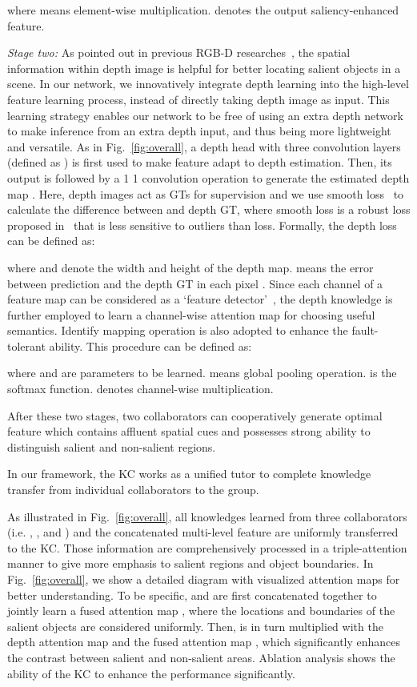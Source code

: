 \documentclass[runningheads]{llncs}
\begin{document}
where  means element-wise multiplication.  denotes the output saliency-enhanced feature.


\emph{ Stage two:} 
As pointed out in previous RGB-D researches~\cite{3DDMRA,3DCPFP}, the spatial information within depth image is helpful for better locating salient objects in a scene.
In our network, we innovatively integrate depth learning into the high-level feature learning process, instead of directly taking depth image as input.
This learning strategy enables our network to be free of using an extra depth network to make inference from an extra depth input,
and thus being more lightweight and versatile.
As in Fig.~\ref{fig:overall}, a depth head with three convolution layers (defined as ) is first used to make feature  adapt to depth estimation.
Then, its output  is followed by a 1  1 convolution operation to generate the estimated depth map .
Here, depth images act as GTs for supervision and we use smooth  loss~\cite{FastRCNN} to calculate the difference between  and depth GT,
where smooth  loss is a robust  loss proposed in~\cite{FastRCNN} that is less sensitive to outliers than  loss.
Formally, the depth loss can be defined as:

where  and  denote the width and height of the depth map.  means the error between prediction  and the depth GT in each pixel .
Since each channel of a feature map can be considered as a ‘feature detector’~\cite{CBAM}, the depth knowledge  is further employed to learn a channel-wise attention map  for choosing useful semantics.
Identify mapping operation is also adopted to enhance the fault-tolerant ability.
This procedure can be defined as: 



where  and  are parameters to be learned.  means global pooling operation.  is the softmax function.  denotes channel-wise multiplication.


After these two stages, two collaborators can cooperatively generate optimal feature which contains affluent spatial cues and possesses strong ability to distinguish salient and non-salient regions.

\label{subsection:3.4}
In our framework, the KC works as a unified tutor to complete knowledge transfer from individual collaborators to the group.

As illustrated in Fig.~\ref{fig:overall}, all knowledges learned from three collaborators (i.e. , , and ) and the concatenated multi-level feature  are uniformly transferred to the KC. Those information are comprehensively processed in a triple-attention manner to give more emphasis to salient regions and object boundaries.
In Fig.~\ref{fig:overall}, we show a detailed diagram with visualized attention maps for better understanding.
To be specific,  and  are first concatenated together to jointly learn a fused attention map , where the locations and boundaries of the salient objects are considered uniformly.
Then,   is in turn multiplied with the depth attention map  and the fused attention map , which significantly enhances the contrast between salient and non-salient areas.
Ablation analysis shows the ability of the KC to enhance the performance significantly.
\end{document}
